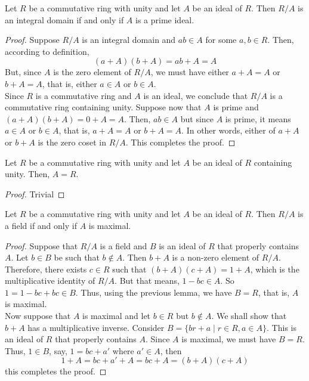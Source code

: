 \begin{proposition}
	Let $R$ be a commutative ring with unity and let $A$ be an ideal of $R$. Then $R/A$ is an integral domain if and only if $A$ is a prime ideal.
\end{proposition}
\begin{proof}
	Suppose $R/A$ is an integral domain and $ab\in A$ for some $a,b\in R$. Then, according to definition,
	\begin{equation*}
		(a+A)(b+A) = ab + A = A
	\end{equation*}
	But, since $A$ is the zero element of $R/A$, we must have either $a+A = A$ or $b+A = A$, that is, either $a\in A$ or $b\in A$.\\
	Since $R$ is a commutative ring and $A$ is an ideal, we conclude that $R/A$ is a commutative ring containing unity. Suppose now that $A$ is prime and $(a+A)(b+A) = 0 + A = A$. Then, $ab\in A$ but since $A$ is prime, it means $a\in A$ or $b\in A$, that is, $a+A = A$ or $b+A = A$. In other words, either of $a+A$ or $b+A$ is the zero coset in $R/A$. This completes the proof.
\end{proof}

\begin{lemma}
	Let $R$ be a commutative ring with unity and let $A$ be an ideal of $R$ containing unity. Then, $A=R$.
\end{lemma}
\begin{proof}
	Trivial
\end{proof}

\begin{proposition}
	Let $R$ be a commutative ring with unity and let $A$ be an ideal of $R$. Then $R/A$ is a field if and only if $A$ is maximal.
\end{proposition}
\begin{proof}
	Suppose that $R/A$ is a field and $B$ is an ideal of $R$ that properly contains $A$. Let $b\in B$ be such that $b\notin A$. Then $b+A$ is a non-zero element of $R/A$. Therefore, there exists $c\in R$ such that $(b+A)(c+A) = 1 + A$, which is the multiplicative identity of $R/A$. But that means, $1-bc\in A$. So $1=1-bc+bc\in B$. Thus, using the previous lemma, we have $B=R$, that is, $A$ is maximal.\\
	Now suppose that $A$ is maximal and let $b\in R$ but $b\notin A$. We shall show that $b+A$ has a multiplicative inverse. Consider $B = \{br+a\mid r\in R, a\in A\}$. This is an ideal of $R$ that properly contains $A$. Since $A$ is maximal, we must have $B=R$. Thus, $1\in B$, say, $1=bc+a'$ where $a'\in A$, then
	\begin{equation*}
		1 + A = bc + a' + A = bc + A = (b+A)(c+A)
	\end{equation*}
	this completes the proof.
\end{proof}